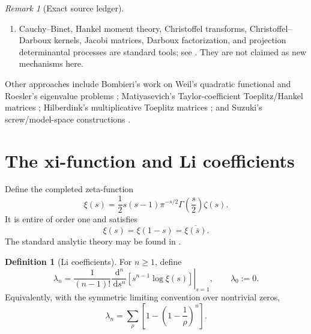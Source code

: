 \documentclass[11pt]{amsart}
\numberwithin{equation}{section}
\theoremstyle{plain}
\theoremstyle{definition}
\newtheorem{definition}[theorem]{Definition}
\theoremstyle{remark}
\newtheorem{remark}[theorem]{Remark}
\newcommand{\dd}{\,\mathrm d}
\begin{document}
\begin{remark}[Exact source ledger]
\begin{enumerate}[label=(\alph*)]
The scalar decomposition $\lambda_n=A_n+Z_n$ used below is obtained directly by splitting
$\log\xi(s)$ into the archimedean factor and $\log((s-1)\zeta(s))$ before taking Cayley
coefficients; no priority is claimed for that scalar factorization.  What is derived here is the
cancellation and matrix structure that appear after taking the reflection differences.
\item Cauchy--Binet, Hankel moment theory, Christoffel transforms, Christoffel--Darboux kernels,
Jacobi matrices, Darboux factorization, and projection determinantal processes are standard tools;
see \cite{Chihara1978,StahlTotik1992,HoughKrishnapurPeresVirag2009}.  They are not claimed as
new mechanisms here.
\end{enumerate}
Other approaches include Bombieri's work on Weil's quadratic functional and Roesler's eigenvalue
problems \cite{Bombieri2000,Roesler1986,Roesler1987}; Matiyasevich's Taylor-coefficient
Toeplitz/Hankel matrices \cite{Matiyasevich2007a,Matiyasevich2007b}; Hilberdink's multiplicative
Toeplitz matrices \cite{Hilberdink2006,Hilberdink2015}; and Suzuki's screw/model-space
constructions \cite{Suzuki2023Norms,Suzuki2023Screw}.
\end{remark}

\section{The xi-function and Li coefficients}
\label{sec:li_background}

Define the completed zeta-function
\begin{equation}
\xi(s)=\frac12 s(s-1)\pi^{-s/2}\Gamma\!\left(\frac{s}{2}\right)\zeta(s).
\label{eq:xi_definition}
\end{equation}
It is entire of order one and satisfies
\begin{equation}
\xi(s)=\xi(1-s)=\overline{\xi(\overline{s})}.
\label{eq:xi_symmetry}
\end{equation}
The standard analytic theory may be found in \cite{Edwards1974,Titchmarsh1986,Bombieri2010}.

\begin{definition}[Li coefficients]
\label{def:li_coefficients}
For $n\ge1$, define
\begin{equation}
\lambda_n=
\frac{1}{(n-1)!}
\left.
\frac{\dd^n}{\dd s^n}
\left[s^{n-1}\log\xi(s)\right]
\right|_{s=1},
\qquad \lambda_0:=0.
\label{eq:li_derivative_definition}
\end{equation}
Equivalently, with the symmetric limiting convention over nontrivial zeros,
\begin{equation}
\lambda_n=
\sum_{\rho}
\left[1-\left(1-\frac1\rho\right)^n\right].
\label{eq:li_zero_definition}
\end{equation}
\end{definition}
\end{document}
